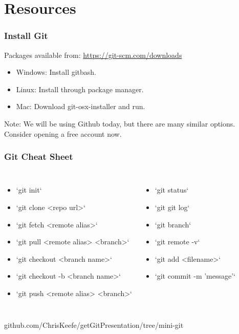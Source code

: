 \documentclass[unknownkeysallowed]{beamer}
\begin{document}
\section{Resources}
\begin{frame}
    \frametitle{Install Git}
    Packages available from: \url{https://git-scm.com/downloads}
    \vspace{0.5cm}
    \begin{itemize}
        \item{Windows: Install gitbash.}
        \item{Linux: Install through package manager.}
        \item{Mac: Download git-osx-installer and run. }
    \end{itemize}
    \vspace{0.5cm}
    Note: We will be using Github today, but there are many similar options. 
	Consider opening a free account now.
\end{frame}

\begin{frame}
\frametitle{Git Cheat Sheet}
\begin{columns}
    \column{2.75in}
        \begin{itemize}
            \item{`git init`}
            \item{`git clone <repo url>`}
            \item{`git fetch <remote alias>`}
            \item{`git pull <remote alias> <branch>`}
            \item{`git checkout <branch name>`}
            \item{`git checkout -b <branch name>`}
            \item{`git push <remote alias> <branch>`}

        \end{itemize}
    \column{2.0in}
        \begin{itemize}
            \item{`git status`}
            \item{`git git log`}
            \item{`git branch`}
            \item{`git remote -v`}
            \item{`git add <filename>`}
            \item{`git commit -m 'message'`}
        \end{itemize}
    \end{columns}
	\vspace{.5cm}
	github.com/ChrisKeefe/getGitPresentation/tree/mini-git
\end{frame}
\end{document}
